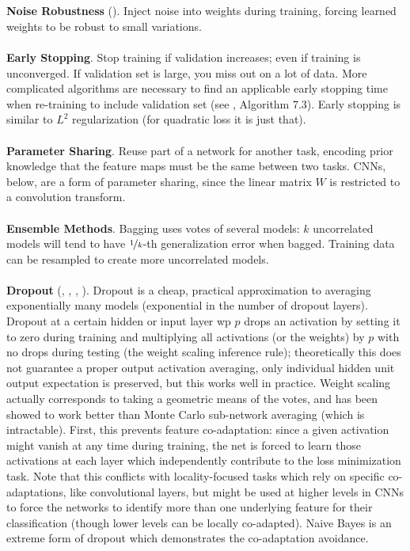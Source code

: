 \documentclass{article}
\begin{document}
\\\\
\noindent
\textbf{Noise Robustness} (). Inject noise into weights during training, forcing learned weights to be robust to small variations.
\\\\
\noindent
\textbf{Early Stopping}. Stop training if validation increases; even if training is unconverged. If validation set is large, you miss out on a lot of data. More complicated algorithms are necessary to find an applicable early stopping time when re-training to include validation set (see , Algorithm 7.3). Early stopping is similar to $L^2$ regularization (for quadratic loss it is just that).
\\\\
\noindent
\textbf{Parameter Sharing}. Reuse part of a network for another task, encoding prior knowledge that the feature maps must be the same between two tasks. CNNs, below, are a form of parameter sharing, since the linear matrix $W$ is restricted to a convolution transform.
\\\\
\noindent
\textbf{Ensemble Methods}. Bagging uses votes of several models: $k$ uncorrelated models will tend to have $\nicefrac{1}{k}$-th generalization error when bagged. Training data can be resampled to create more uncorrelated models.
\\\\
\noindent
\textbf{Dropout} (, , , ). Dropout is a cheap, practical approximation to averaging exponentially many models (exponential in the number of dropout layers). Dropout at a certain hidden or input layer wp $p$ drops an activation by setting it to zero during training and multiplying all activations (or the weights) by $p$ with no drops during testing (the weight scaling inference rule); theoretically this does not guarantee a proper output activation averaging, only individual hidden unit output expectation is preserved, but this works well in practice. Weight scaling actually corresponds to taking a geometric means of the votes, and has been showed to work better than Monte Carlo sub-network averaging (which is intractable). First, this prevents feature co-adaptation: since a given activation might vanish at any time during training, the net is forced to learn those activations at each layer which independently contribute to the loss minimization task. Note that this conflicts with locality-focused tasks which rely on specific co-adaptations, like convolutional layers, but might be used at higher levels in CNNs to force the networks to identify more than one underlying feature for their classification (though lower levels can be locally co-adapted). Naive Bayes is an extreme form of dropout which demonstrates the co-adaptation avoidance.
\end{document}
